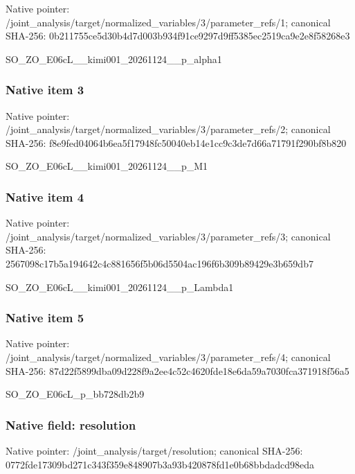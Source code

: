 \documentclass[10pt,a4paper]{article}
\begin{document}
Native pointer: /joint\_analysis/target/n\allowbreak{}ormalized\_variables/3/pa\allowbreak{}rameter\_refs/1; canonical SHA-256: 0b211755ce5d30b4d7d003b9\allowbreak{}34f91ce9297d9ff5385ec251\allowbreak{}9ca9e2e8f58268e3


SO\_ZO\_E06cL\_\_kimi001\_20261124\_\_p\_alpha1


\subsubsection{Native item 3}


Native pointer: /joint\_analysis/target/n\allowbreak{}ormalized\_variables/3/pa\allowbreak{}rameter\_refs/2; canonical SHA-256: f8e9fed04064b6ea5f17948f\allowbreak{}c50040eb14e1cc9c3de7d66a\allowbreak{}71791f290bf8b820


SO\_ZO\_E06cL\_\_kimi001\_20261124\_\_p\_M1


\subsubsection{Native item 4}


Native pointer: /joint\_analysis/target/n\allowbreak{}ormalized\_variables/3/pa\allowbreak{}rameter\_refs/3; canonical SHA-256: 2567098c17b5a194642c4c88\allowbreak{}1656f5b06d5504ac196f6b30\allowbreak{}9b89429e3b659db7


SO\_ZO\_E06cL\_\_kimi001\_202\allowbreak{}61124\_\_p\_Lambda1


\subsubsection{Native item 5}


Native pointer: /joint\_analysis/target/n\allowbreak{}ormalized\_variables/3/pa\allowbreak{}rameter\_refs/4; canonical SHA-256: 87d22f5899dba09d228f9a2e\allowbreak{}e4c52c4620fde18e6da59a70\allowbreak{}30fca371918f56a5


SO\_ZO\_E06cL\_p\_bb728db2b9


\subsubsection{Native field: resolution}


Native pointer: /joint\_analysis/target/resolution; canonical SHA-256: 0772fde17309bd271c343f35\allowbreak{}9e848907b3a93b420878fd1e\allowbreak{}0b68bbdadcd98eda
\end{document}
